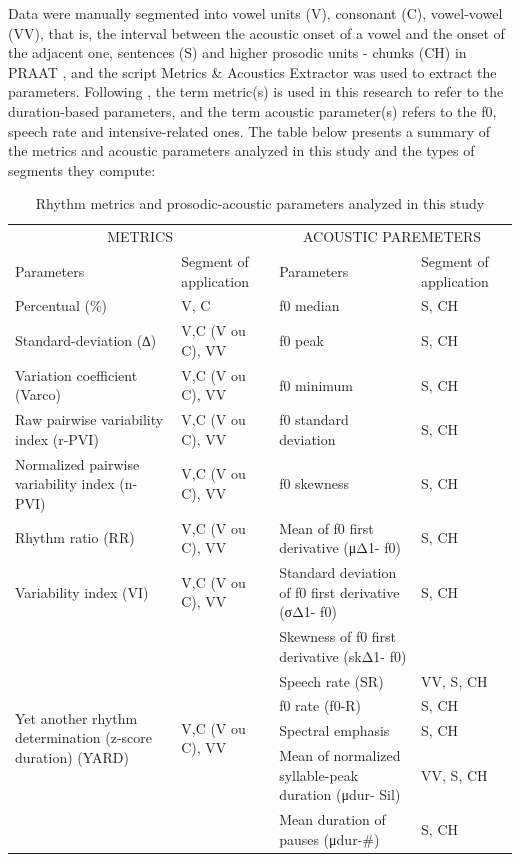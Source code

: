 Data were manually segmented into vowel units (V), consonant (C), vowel-vowel
(VV), that is, the interval between the acoustic onset of a vowel and the onset
of the adjacent one, sentences (S) and higher prosodic units - chunks (CH) in
PRAAT \citep{boersma_praat}, and the script Metrics \& Acoustics Extractor
\citep{silva2020} was used to extract the parameters. Following \citet{silva2020},
the term metric(s) is used in this research to refer
to the duration-based parameters, and the term acoustic parameter(s) refers to
the f0, speech rate and intensive-related ones. The table below presents a
summary of the metrics and acoustic parameters analyzed in this study and the
types of segments they compute:

\begin{table}
\caption{Rhythm metrics and prosodic-acoustic parameters analyzed in this study}\label{leo-tab01}
\begin{scriptsize}
\begin{tabular}{@{}p{3.1cm}p{1.6cm}p{2cm}p{1.5cm}@{}}
\toprule
\multicolumn{2}{c}{METRICS\protect\footnotemark[1]} & \multicolumn{2}{c}{ACOUSTIC PAREMETERS}\\
Parameters & Segment of application & Parameters & Segment of application \\
\midrule 
Percentual (\%) & V, C & f0 median & S, CH \\
Standard-deviation (∆) & V,C (V ou C), VV & f0 peak & S, CH \\
Variation coefficient (Varco)\protect\footnotemark[2] & V,C (V ou C), VV &  f0 minimum & S, CH \\
Raw pairwise variability index (r-PVI)\protect\footnotemark[3] & V,C (V ou C), VV & f0 standard deviation & S, CH \\
Normalized pairwise variability index (n-PVI)\protect\footnotemark[4] & V,C (V ou C), VV & f0 skewness & S, CH \\
Rhythm ratio (RR)\protect\footnotemark[5] & V,C (V ou C), VV & Mean of f0 first derivative (μΔ1- f0) & S, CH \\
Variability index (VI)\protect\footnotemark[6] & V,C (V ou C), VV & Standard deviation of f0 first derivative (σΔ1- f0) & S, CH \\
\multirow{6}{=}{Yet another rhythm determination (z-score duration) (YARD)\protect\footnotemark[7]} & \multirow{6}{*}{V,C (V ou C), VV} & Skewness of f0 first derivative (skΔ1- f0) & \\
   &  & Speech rate (SR) & VV, S, CH \\
   &  & f0 rate (f0-R)  & S, CH \\
   &  & Spectral emphasis & S, CH \\
   &  & Mean of normalized syllable-peak duration (μdur- Sil) & VV, S, CH \\
   &  & Mean duration of pauses (μdur-\#) & S, CH \\
\bottomrule
\end{tabular}
\end{scriptsize}
\end{table}
